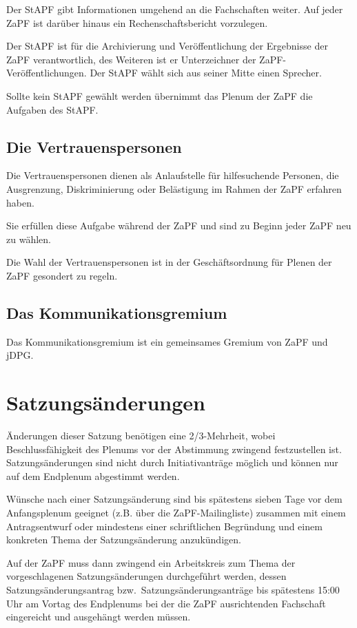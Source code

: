 \documentclass[draft,12pt,oneside]{scrreprt}
\begin{document}
Der StAPF gibt Informationen umgehend an die Fachschaften weiter.
Auf jeder ZaPF ist darüber hinaus ein Rechenschaftsbericht vorzulegen.

Der StAPF ist für die Archivierung und Veröffentlichung der Ergebnisse der ZaPF
verantwortlich, des Weiteren ist er Unterzeichner der ZaPF-Veröffentlichungen.
Der StAPF wählt sich aus seiner Mitte einen Sprecher.

Sollte kein StAPF gewählt werden übernimmt das Plenum der ZaPF die Aufgaben
des StAPF.

\subsection{Die Vertrauenspersonen}

Die Vertrauenspersonen dienen als Anlaufstelle für hilfesuchende Personen, die
Ausgrenzung, Diskriminierung oder Belästigung im Rahmen der ZaPF erfahren haben.

Sie erfüllen diese Aufgabe während der ZaPF und sind zu Beginn jeder ZaPF neu
zu wählen.

Die Wahl der Vertrauenspersonen ist in der Geschäftsordnung für Plenen der ZaPF
gesondert zu regeln.

\subsection{Das Kommunikationsgremium}

Das Kommunikationsgremium ist ein gemeinsames Gremium von ZaPF und jDPG.

\section{Satzungsänderungen}
Änderungen dieser Satzung benötigen eine 2/3-Mehrheit, wobei Beschlussfähigkeit
des Plenums vor der Abstimmung zwingend festzustellen ist. Satzungsänderungen
sind nicht durch Initiativanträge möglich und können nur auf dem Endplenum
abgestimmt werden.

Wünsche nach einer Satzungsänderung sind bis spätestens sieben Tage vor dem
Anfangsplenum geeignet (z.B. über die ZaPF-Mailingliste)
zusammen mit einem Antragsentwurf oder mindestens einer schriftlichen
Begründung und einem konkreten Thema der Satzungsänderung anzukündigen.

Auf der ZaPF muss dann zwingend ein Arbeitskreis zum Thema der vorgeschlagenen
Satzungsänderungen durchgeführt werden, dessen Satzungsänderungsantrag bzw.\
Satzungsänderungsanträge bis spätestens 15:00 Uhr am Vortag des Endplenums bei
der die ZaPF ausrichtenden Fachschaft eingereicht und ausgehängt werden müssen.
\end{document}

